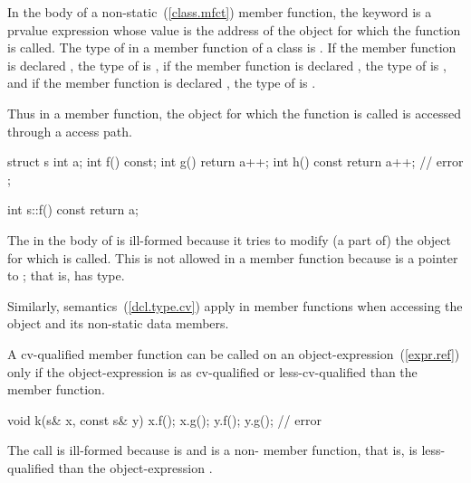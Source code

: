 \pnum
{}%
In the body of a non-static~(\ref{class.mfct}) member function, the
keyword  is a prvalue expression whose value is the
address of the object for which the function is called.
%
The type of  in a member function of a class  is
.
%
If the member function is declared , the type of
 is  ,
%
if the member function is declared , the type of
 is  , and if the member function
is declared  , the type of  is
  .
%
\begin{note} Thus in a  member function, the object for which the function is
called is accessed through a  access path. \end{note}
\begin{example}

\begin{codeblock}
struct s {
  int a;
  int f() const;
  int g() { return a++; }
  int h() const { return a++; } // error
};

int s::f() const { return a; }
\end{codeblock}

The  in the body of  is ill-formed because it
tries to modify (a part of) the object for which  is
called. This is not allowed in a  member function because
 is a pointer to ; that is,  has
 type.
\end{example}

\pnum
Similarly,  semantics~(\ref{dcl.type.cv}) apply in
 member functions when accessing the object and its
non-static data members.

\pnum
A cv-qualified member function can be called on an
object-expression~(\ref{expr.ref}) only if the object-expression is as
cv-qualified or less-cv-qualified than the member function.
\begin{example}

\begin{codeblock}
void k(s& x, const s& y) {
  x.f();
  x.g();
  y.f();
  y.g();                        // error
}
\end{codeblock}

The call  is ill-formed because  is 
and  is a non- member function, that is,
 is less-qualified than the object-expression .
\end{example}

